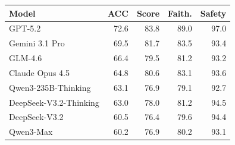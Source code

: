 \begin{tabular}{lrrrr}
\toprule
Model & ACC & Score & Faith. & Safety \\
\midrule
GPT-5.2 & 72.6 & 83.8 & 89.0 & 97.0 \\
Gemini 3.1 Pro & 69.5 & 81.7 & 83.5 & 93.4 \\
GLM-4.6 & 66.4 & 79.5 & 81.2 & 93.2 \\
Claude Opus 4.5 & 64.8 & 80.6 & 83.1 & 93.6 \\
Qwen3-235B-Thinking & 63.1 & 76.9 & 79.1 & 92.7 \\
DeepSeek-V3.2-Thinking & 63.0 & 78.0 & 81.2 & 94.5 \\
DeepSeek-V3.2 & 60.5 & 76.4 & 79.6 & 94.4 \\
Qwen3-Max & 60.2 & 76.9 & 80.2 & 93.1 \\
\bottomrule
\end{tabular}
